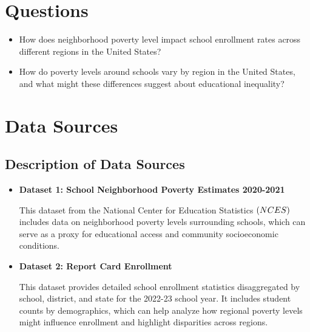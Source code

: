 \documentclass[a4paper,11pt]{article}
\begin{document}
\section{Questions}
\begin{itemize}
    \item How does neighborhood poverty level impact school enrollment rates across different regions in the United States?
    
    \item How do poverty levels around schools vary by region in the United States, and what might these differences suggest about educational inequality?
\end{itemize}

\section{Data Sources}
    \subsection{Description of Data Sources}
    \begin{itemize}
    \item \textbf{Dataset 1: School Neighborhood Poverty Estimates 2020-2021}
    
    This dataset from the National Center for Education Statistics \(\text(NCES)\) includes data on neighborhood poverty levels surrounding schools, which can serve as a proxy for educational access and community socioeconomic conditions. \cite{dataset1} 

    \item \textbf{Dataset 2: Report Card Enrollment}

    This dataset provides detailed school enrollment statistics disaggregated by school, district, and state for the 2022-23 school year. It includes student counts by demographics, which can help analyze how regional poverty levels might influence enrollment and highlight disparities across regions.\cite{dataset2}
\end{itemize}
\end{document}

